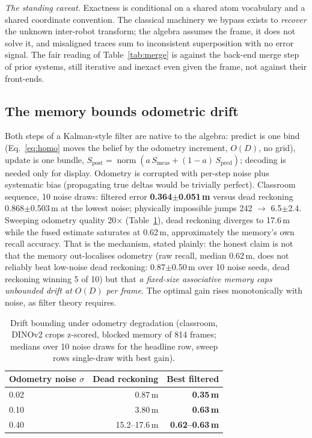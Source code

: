 \documentclass[conference]{IEEEtran}
\begin{document}
\emph{The standing caveat.} Exactness is conditional on a shared atom
vocabulary and a shared coordinate convention. The classical machinery we
bypass exists to \emph{recover} the unknown inter-robot transform; the
algebra assumes the frame, it does not solve it, and misaligned traces
sum to inconsistent superposition with no error signal. The fair reading
of Table~\ref{tab:merge} is against the back-end merge step of prior
systems, still iterative and inexact even given the frame, not
against their front-ends.

\subsection{The memory bounds odometric drift}
\label{sec:kalman-results}

Both steps of a Kalman-style filter are native to the algebra: predict is
one bind (Eq.~\eqref{eq:homo} moves the belief by the odometry increment,
$O(D)$, no grid), update is one bundle,
$S_{\text{post}} = \operatorname{norm}(a\,S_{\text{meas}} +
(1-a)\,S_{\text{pred}})$; decoding is needed only for display. Odometry
is corrupted with per-step noise plus systematic bias (propagating true
deltas would be trivially perfect). Classroom sequence, 10 noise draws:
filtered error \textbf{0.364$\pm$0.051\,m} versus dead
reckoning 0.868$\pm$0.503\,m at the lowest noise; physically impossible
jumps 242 $\to$ 6.5$\pm$2.4. Sweeping odometry quality 20$\times$
(Table~\ref{tab:kalman}), dead reckoning diverges to 17.6\,m while the
fused estimate saturates at 0.62\,m, approximately the memory's own
recall accuracy. That is the mechanism, stated plainly: the honest claim
is not that the memory out-localises odometry (raw recall, median
0.62\,m, does not reliably beat low-noise dead reckoning:
0.87$\pm$0.50\,m over 10 noise seeds, dead reckoning winning 5 of 10)
but that \emph{a fixed-size associative memory caps unbounded drift at
$O(D)$ per frame}. The optimal
gain rises monotonically with noise, as filter theory requires.

\begin{table}[t]
\caption{Drift bounding under odometry degradation (classroom, DINOv2
crops z-scored, blocked memory of 814 frames; medians over 10 noise
draws for the headline row, sweep rows single-draw with best gain).}
\label{tab:kalman}
\centering
\small
\begin{tabular}{@{}lrr@{}}
\toprule
Odometry noise $\sigma$ & Dead reckoning & Best filtered \\
\midrule
0.02 & 0.87\,m & \textbf{0.35\,m} \\
0.10 & 3.80\,m & \textbf{0.63\,m} \\
0.40 & 15.2--17.6\,m & \textbf{0.62--0.63\,m} \\
\bottomrule
\end{tabular}
\end{table}
\end{document}
